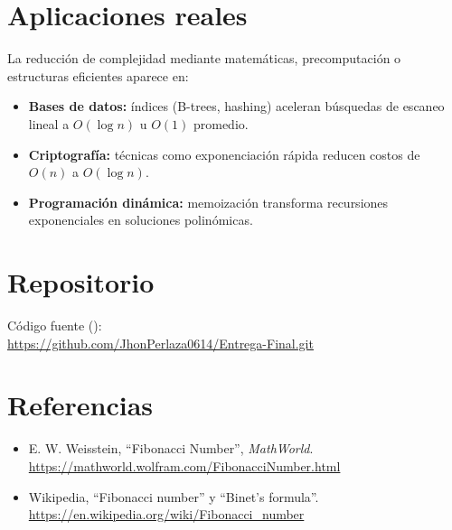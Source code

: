 \documentclass[twocolumn]{article}
\begin{document}
\section{Aplicaciones reales}
La reducción de complejidad mediante matemáticas, precomputación o estructuras eficientes aparece en:
\begin{itemize}
\item \textbf{Bases de datos:} índices (B-trees, hashing) aceleran búsquedas de escaneo lineal a $O(\log n)$ u $O(1)$ promedio.
\item \textbf{Criptografía:} técnicas como exponenciación rápida reducen costos de $O(n)$ a $O(\log n)$.
\item \textbf{Programación dinámica:} memoización transforma recursiones exponenciales en soluciones polinómicas.
\end{itemize}

\section{Repositorio}
Código fuente ():\\
\url{https://github.com/JhonPerlaza0614/Entrega-Final.git}

\section{Referencias}
\begin{itemize}
\item E. W. Weisstein, ``Fibonacci Number'', \emph{MathWorld}. \url{https://mathworld.wolfram.com/FibonacciNumber.html}
\item Wikipedia, ``Fibonacci number'' y ``Binet's formula''. \url{https://en.wikipedia.org/wiki/Fibonacci_number}
\end{itemize}
\end{document}
